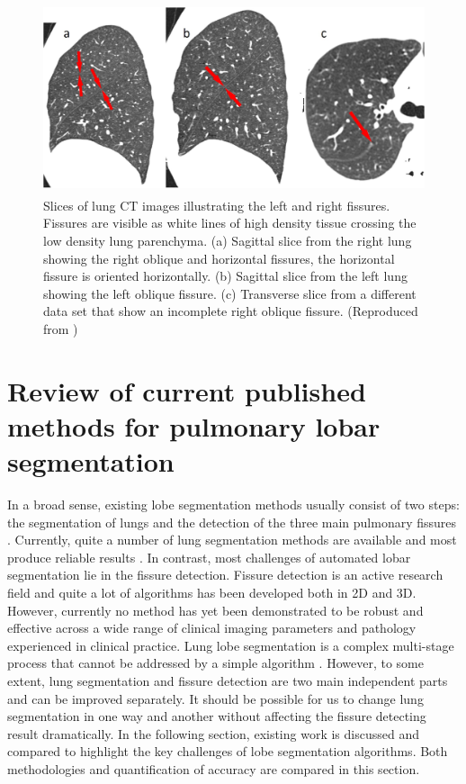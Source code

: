 \begin{figure}[htbp]
  \centering 
  \includegraphics[height=2.2in]{Segmentation/Image/FissureSegmentationChanllenges.jpg}
  \caption{Slices of lung CT images illustrating the left and right fissures. Fissures are visible as white lines of high density tissue crossing the low density lung parenchyma. (a) Sagittal slice from the right lung showing the right oblique and horizontal fissures, the horizontal fissure is oriented horizontally. (b) Sagittal slice from the left lung showing the left oblique fissure. (c) Transverse slice from a different data set that show an incomplete right oblique fissure. (Reproduced from \citep{ukil2009anatomy})}
  \label{fig:FissureSegmentationChanllenges}
\end{figure}

\section{Review of current published methods for pulmonary lobar segmentation} \label{SegmentationReview}
In a broad sense, existing lobe segmentation methods usually consist of two steps: the segmentation of lungs and the detection of the three main pulmonary fissures \citep{van2013automated}. Currently, quite a number of lung segmentation methods are available and most produce reliable results \citep{hu2001automatic,ukil2005smoothing,sun20063d,pu2008adaptive,wang2009automated}. In contrast, most challenges of automated lobar segmentation lie in the fissure detection. Fissure detection is an active research field and quite a lot of algorithms has been developed both in 2D and 3D. However, currently no method has yet been demonstrated to be robust and effective across a wide range of clinical imaging parameters and pathology experienced in clinical practice. Lung lobe segmentation is a complex multi-stage process that cannot be addressed by a simple algorithm \citep{van2013automated,pu2009computational,ukil2009anatomy}. However, to some extent, lung segmentation and fissure detection are two main independent parts and can be improved separately. It should be possible for us to change lung segmentation in one way and another without affecting the fissure detecting result dramatically. In the following section, existing work is discussed and compared to highlight the key challenges of lobe segmentation algorithms. Both methodologies and quantification of accuracy are compared in this section. 

